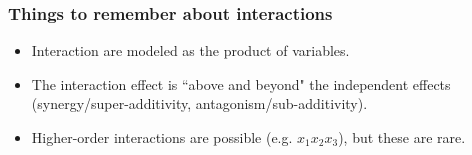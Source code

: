 \documentclass{beamer}
\begin{document}
\begin{frame}
\frametitle{Things to remember about interactions}

\begin{itemize}
	\item Interaction are modeled as the product of variables.
	\item The interaction effect is ``above and beyond" the independent effects (synergy/super-additivity, antagonism/sub-additivity).
	\item Higher-order interactions are possible (e.g. $x_1x_2x_3$), but these are rare.
\end{itemize}
\end{frame}
\end{document}
